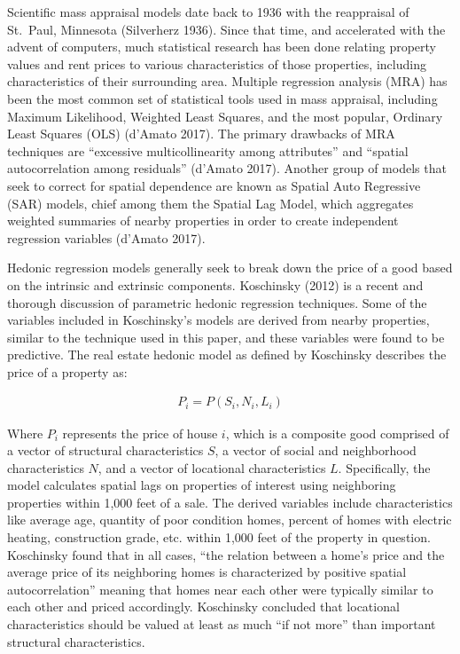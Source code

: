 \documentclass[12pt,]{article}
\begin{document}
Scientific mass appraisal models date back to 1936 with the reappraisal
of St.~Paul, Minnesota (Silverherz 1936). Since that time, and
accelerated with the advent of computers, much statistical research has
been done relating property values and rent prices to various
characteristics of those properties, including characteristics of their
surrounding area. Multiple regression analysis (MRA) has been the most
common set of statistical tools used in mass appraisal, including
Maximum Likelihood, Weighted Least Squares, and the most popular,
Ordinary Least Squares (OLS) (d'Amato 2017). The primary drawbacks of
MRA techniques are ``excessive multicollinearity among attributes'' and
``spatial autocorrelation among residuals'' (d'Amato 2017). Another
group of models that seek to correct for spatial dependence are known as
Spatial Auto Regressive (SAR) models, chief among them the Spatial Lag
Model, which aggregates weighted summaries of nearby properties in order
to create independent regression variables (d'Amato 2017).

Hedonic regression models generally seek to break down the price of a
good based on the intrinsic and extrinsic components. Koschinsky (2012)
is a recent and thorough discussion of parametric hedonic regression
techniques. Some of the variables included in Koschinsky's models are
derived from nearby properties, similar to the technique used in this
paper, and these variables were found to be predictive. The real estate
hedonic model as defined by Koschinsky describes the price of a property
as:

\[
\begin{aligned}
 P_i = P(S_i, N_i, L_i)
\end{aligned}
\]

Where \(P_i\) represents the price of house \(i\), which is a composite
good comprised of a vector of structural characteristics \(S\), a vector
of social and neighborhood characteristics \(N\), and a vector of
locational characteristics \(L\). Specifically, the model calculates
spatial lags on properties of interest using neighboring properties
within 1,000 feet of a sale. The derived variables include
characteristics like average age, quantity of poor condition homes,
percent of homes with electric heating, construction grade, etc. within
1,000 feet of the property in question. Koschinsky found that in all
cases, ``the relation between a home's price and the average price of
its neighboring homes is characterized by positive spatial
autocorrelation'' meaning that homes near each other were typically
similar to each other and priced accordingly. Koschinsky concluded that
locational characteristics should be valued at least as much ``if not
more'' than important structural characteristics.
\end{document}
